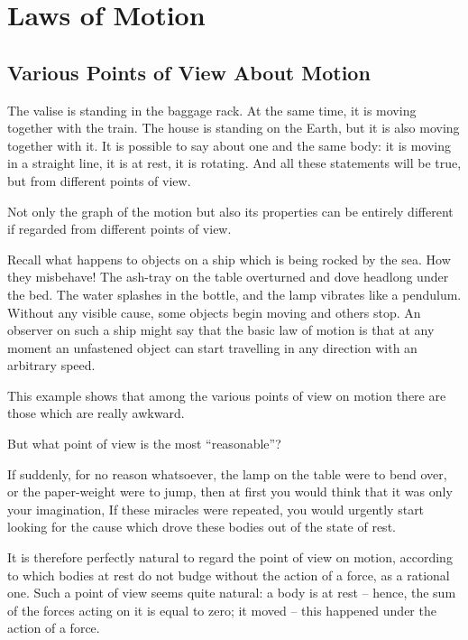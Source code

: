 

\cleardoublepage
\chapter{Laws of Motion}
\label{02-motion}

\section{Various Points of View About Motion}

The valise is standing in the baggage rack. At the same time, it is moving together with the train. The house is standing on the Earth, but it is also moving together with it. It is possible to say about one and the same body: it is moving in a straight line, it is at rest, it is rotating. And all these statements will be true, but from different points of view.

Not only the graph of the motion but also its properties can be
entirely different if regarded from different points of view.

Recall what happens to objects on a ship which is being rocked by the sea. How they misbehave! The ash-tray on the table overturned and dove headlong under the bed.  The water splashes in the bottle, and the lamp vibrates like a pendulum. Without any visible cause, some objects begin moving and others stop. An observer on such a ship might say that the basic law of motion is that at any moment an unfastened object can start travelling in any direction with an arbitrary speed.


This example shows that among the various points of view on motion
there are those which are really awkward.

But what point of view is the most ``reasonable''?

If suddenly, for no reason whatsoever, the lamp on the table were to
bend over, or the paper-weight were to jump, then at first you would
think that it was only your imagination, If these miracles were
repeated, you would urgently start looking for the cause which drove
these bodies out of the state of rest.

It is therefore perfectly natural to regard the point of view on
motion, according to which bodies at rest do not budge without the
action of a force, as a rational one.  Such a point of view seems
quite natural: a body is at rest -- hence, the sum of the forces
acting on it is equal to zero; it moved -- this happened under the
action of a force.  

